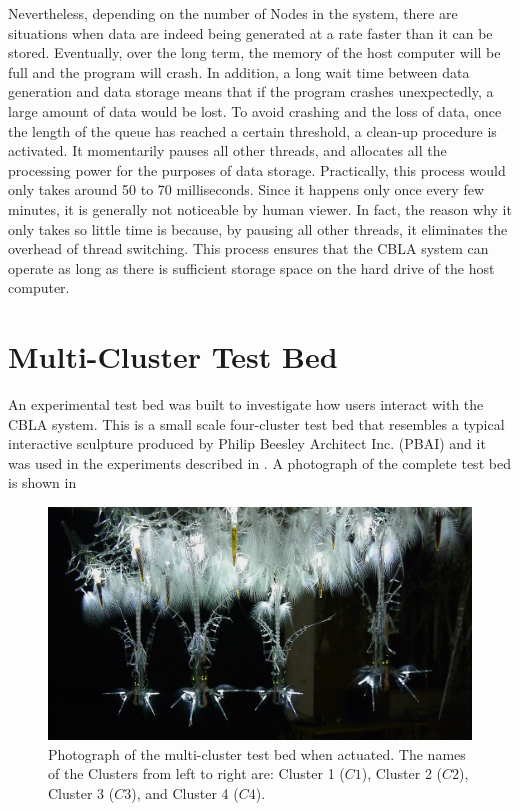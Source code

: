 Nevertheless, depending on the number of Nodes in the system, there are situations when data are indeed being generated at a rate faster than it can be stored. Eventually, over the long term, the memory of the host computer will be full and the program will crash. In addition, a long wait time between data generation and data storage means that if the program crashes unexpectedly, a large amount of data would be lost. To avoid crashing and the loss of data, once the length of the queue has reached a certain threshold, a clean-up procedure is activated. It momentarily pauses all other threads, and allocates all the processing power for the purposes of data storage. Practically, this process would only takes around 50 to 70 milliseconds. Since it happens only once every few minutes, it is generally not noticeable by human viewer. In fact, the reason why it only takes so little time is because, by pausing all other threads, it eliminates the overhead of thread switching. This process ensures that the CBLA system can operate as long as there is sufficient storage space on the hard drive of the host computer. 


\section{Multi-Cluster Test Bed}\label{sec:multi-cluster-test-bed}

An experimental test bed was built to investigate how users interact with the CBLA system. This is a small scale four-cluster test bed that resembles a typical interactive sculpture produced by Philip Beesley Architect Inc. (PBAI) and it was used in the experiments described in . A photograph of the complete test bed is shown in 

\begin{figure} [!htb]
	\centering
	\includegraphics[width=1.0\textwidth]{"fig/validations/cbla-test-bed photo 2"}
	\caption[Photograph of the multi-cluster test bed]{Photograph of the multi-cluster test bed when actuated. The names of the Clusters from left to right are: Cluster 1 ($C1$), Cluster 2 ($C2$), Cluster 3 ($C3$), and Cluster 4 ($C4$).}
	\label{fig:cbla-test-bed photo 2}
\end{figure}


